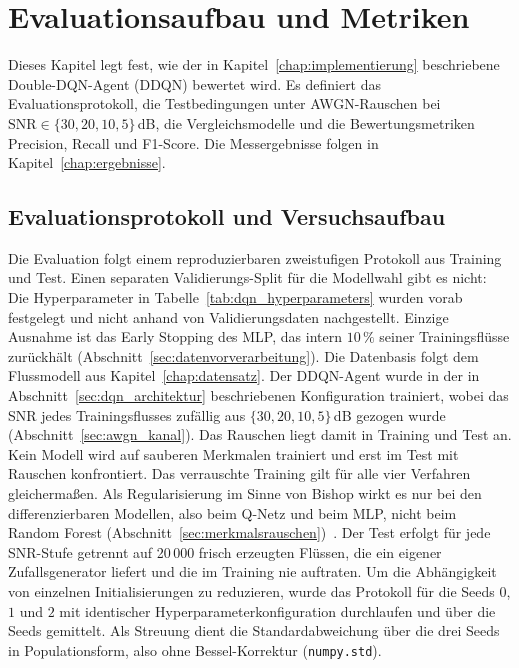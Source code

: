 \chapter{Evaluationsaufbau und Metriken}
\label{chap:evaluierung}

Dieses Kapitel legt fest, wie der in Kapitel~\ref{chap:implementierung} beschriebene Double-DQN-Agent (DDQN) bewertet wird. Es definiert das Evaluationsprotokoll, die Testbedingungen unter AWGN-Rauschen bei $\mathrm{SNR}\in\{30,20,10,5\}$\,dB, die Vergleichsmodelle und die Bewertungsmetriken Precision, Recall und F1-Score. Die Messergebnisse folgen in Kapitel~\ref{chap:ergebnisse}.

\section{Evaluationsprotokoll und Versuchsaufbau}
\label{sec:eval_protokoll}

Die Evaluation folgt einem reproduzierbaren zweistufigen Protokoll aus Training und Test. Einen separaten Validierungs-Split für die Modellwahl gibt es nicht: Die Hyperparameter in Tabelle~\ref{tab:dqn_hyperparameters} wurden vorab festgelegt und nicht anhand von Validierungsdaten nachgestellt. Einzige Ausnahme ist das Early Stopping des MLP, das intern $10\,\%$ seiner Trainingsflüsse zurückhält (Abschnitt~\ref{sec:datenvorverarbeitung}). Die Datenbasis folgt dem Flussmodell aus Kapitel~\ref{chap:datensatz}. Der DDQN-Agent wurde in der in Abschnitt~\ref{sec:dqn_architektur} beschriebenen Konfiguration trainiert, wobei das SNR jedes Trainingsflusses zufällig aus $\{30,20,10,5\}$\,dB gezogen wurde (Abschnitt~\ref{sec:awgn_kanal}). Das Rauschen liegt damit in Training und Test an. Kein Modell wird auf sauberen Merkmalen trainiert und erst im Test mit Rauschen konfrontiert. Das verrauschte Training gilt für alle vier Verfahren gleichermaßen. Als Regularisierung im Sinne von Bishop wirkt es nur bei den differenzierbaren Modellen, also beim Q-Netz und beim MLP, nicht beim Random Forest (Abschnitt~\ref{sec:merkmalsrauschen})~\autocite{bishopTrainingNoiseEquivalent1995}. Der Test erfolgt für jede SNR-Stufe getrennt auf 20\,000 frisch erzeugten Flüssen, die ein eigener Zufallsgenerator liefert und die im Training nie auftraten. Um die Abhängigkeit von einzelnen Initialisierungen zu reduzieren, wurde das Protokoll für die Seeds $0$, $1$ und $2$ mit identischer Hyperparameterkonfiguration durchlaufen und über die Seeds gemittelt. Als Streuung dient die Standardabweichung über die drei Seeds in Populationsform, also ohne Bessel-Korrektur (\texttt{numpy.std}).

